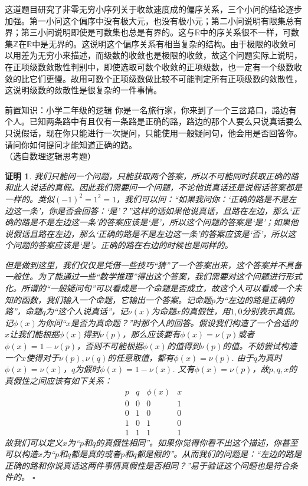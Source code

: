 \documentclass[UTF8, a4paper, 12pt, oneside, twocolumn]{article}
\numberwithin{equation}{section}
\numberwithin{figure}{section}
\numberwithin{table}{section}
\def\R{\mathbb{R}}	%
\def\Z{\mathbb{Z}}	%
\newtheorem*{Proof}{证明}
\newif\ifproof
\newenvironment{Ex}[1][]{\prooffalse \begin{EExercise}{#1}{}}%
{\ifproof%
\hfill\ensuremath{\square}\end{Proof}%
\fi%
\end{EExercise}}
\newcommand{\pr}{\tcblower \begin{Proof}\prooftrue }
\begin{document}
\begin{Remark}{}{}
这道题目研究了非零无穷小序列关于收敛速度成的偏序关系，三个小问的结论逐步加强。第一小问这个偏序中没有极大元，也没有极小元；第二小问说明有限集总有界；第三小问说明即使是可数集也总是有界的。这与$\R$中的序关系很不一样，可数集$\Z$在$\R$中是无界的。这说明这个偏序关系有相当复杂的结构。由于极限的收敛可以用差为无穷小来描述，而级数的收敛也是极限的收敛，故这个问题实际上说明，在正项级数敛散性判别中，即使选取可数个收敛的正项级数，也一定有一个级数收敛的比它们更慢。故用可数个正项级数做比较不可能判定所有正项级数的敛散性，这说明级数的敛散性是很复杂的一件事情。
\end{Remark}
\begin{Ex}[前置知识：小学二年级的逻辑]{}
你是一名旅行家，你来到了一个三岔路口，路边有个人。已知两条路中有且仅有一条路是正确的路，路边的那个人要么只说真话要么只说假话，现在你只能进行一次提问，只能使用一般疑问句，他会用是否回答你。请问你如何提问才能知道正确的路。\\
（选自数理逻辑思考题）
\pr
我们只能问一个问题，只能获取两个答案，所以不可能同时获取正确的路和此人说话的真假。因此我们需要问一个问题，不论他说真话还是说假话答案都是一样的。类似$(-1)^2=1^2=1$，我们可以问：“如果我问你：`正确的路是不是左边这一条’，你是否会回答：`是’？”这样的话如果他说真话，且路在左边，那么`正确的路是不是左边这一条’的答案应该是`是’，所以这个问题的答案是`是’；如果他说假话且路在左边，那么`正确的路是不是左边这一条’的答案应该是`否'，所以这个问题的答案应该是`是'。正确的路在右边的时候也是同样的。

但是做到这里，我们仅仅是凭借一些技巧“猜”了一个答案出来，这个答案并不具备一般性。为了能通过一些“数学推理”得出这个答案，我们需要对这个问题进行形式化。所谓的“一般疑问句”可以看成是一个命题是否成立，故这个人可以看成一个未知的函数，我们输入一个命题，它输出一个答案。记命题$p$为“左边的路是正确的路”，命题$q$为“这个人说真话”，记$\nu(x)$为命题$x$的真假性，用$1,0$分别表示真假。记$\phi(x)$为你问“$x$是否为真命题？”时那个人的回答。假设我们构造了一个合适的$x$让我们能根据$\phi(x)$得到$\nu(p)$，那么应该要有$\phi(x)=\nu(p)$或者$\phi(x)=1-\nu(p)$，否则不可能根据$\phi(x)$的值得到$\nu(p)$的值。不妨尝试构造一个$x$使得对于$\nu(p),\nu(q)$的任意取值，都有$\phi(x)=\nu(p)$. 由于$q$为真时$\phi(x)=\nu(x)$，$q$为假时$\phi(x)=1-\nu(x)$. 又有$\phi(x)=\nu(p)$，故$p,q,x$的真假性之间应该有如下关系：
$$\begin{array}{cccc}
p&q&\phi(x)&x\\
0&0&0&1\\
0&1&0&0\\
1&0&1&0\\
1&1&1&1
\end{array}$$
故我们可以定义$x$为“$p$和$q$的真假性相同”。如果你觉得你看不出这个描述，你甚至可以构造$x$为“$p$和$q$都是真的或者$p$和$q$都是假的”。从而我们的问题是：“左边的路是正确的路和你说真话这两件事情真假性是否相同？”易于验证这个问题也是符合条件的。
\end{Ex}
\end{document}
